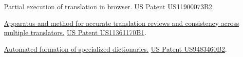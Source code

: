 
\href{https://patents.google.com/patent/US20230070302A1}{Partial execution of translation in browser}. \hypersetup{urlcolor=black}\href{https://patents.google.com/patent/US20230070302A1}{US Patent US11900073B2}\hypersetup{urlcolor=linkcol}. %

{\small \href{https://patents.google.com/patent/US11361170B1}{Apparatus and method for accurate translation reviews and consistency across multiple translators.} \hypersetup{urlcolor=black}\href{https://patents.google.com/patent/US11361170B1}{US Patent US11361170B1}\hypersetup{urlcolor=linkcol}. } %

\href{https://patents.google.com/patent/US9483460B2}{Automated formation of specialized dictionaries.} \hypersetup{urlcolor=black}\href{https://patents.google.com/patent/US9483460B2}{US Patent US9483460B2}\hypersetup{urlcolor=linkcol}. \\ %

